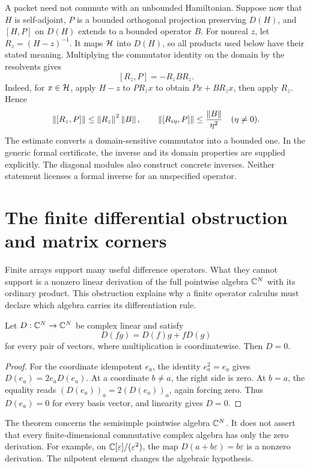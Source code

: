 A packet need not commute with an unbounded Hamiltonian. Suppose now that $H$ is self-adjoint, $P$ is a bounded orthogonal projection preserving $D(H)$, and $[H,P]$ on $D(H)$ extends to a bounded operator $B$. For nonreal $z$, let $R_z=(H-z)^{-1}$. It maps $\mathcal H$ into $D(H)$, so all products used below have their stated meaning. Multiplying the commutator identity on the domain by the resolvents gives
\[
 [R_z,P]=-R_zBR_z.
\]
Indeed, for $x\in\mathcal H$, apply $H-z$ to $PR_zx$ to obtain $Px+BR_zx$, then apply $R_z$. Hence
\[
 \left\lVert[R_z,P]\right\rVert\leq\left\lVert R_z\right\rVert^2\left\lVert B\right\rVert,
 \qquad
 \left\lVert[R_{i\eta},P]\right\rVert\leq\frac{\left\lVert B\right\rVert}{\eta^2}
 \quad(\eta\ne0).
\]
The estimate converts a domain-sensitive commutator into a bounded one. In the generic formal certificate, the inverse and its domain properties are supplied explicitly. The diagonal modules also construct concrete inverses. Neither statement licenses a formal inverse for an unspecified operator.



\clearpage
\section{The finite differential obstruction and matrix corners}
\label{sec:foundation-corner-derivations}

Finite arrays support many useful difference operators. What they cannot support is a nonzero linear derivation of the full pointwise algebra $\mathbb C^N$ with its ordinary product. This obstruction explains why a finite operator calculus must declare which algebra carries its differentiation rule.

\begin{theorem}
Let $D:\mathbb C^N\to\mathbb C^N$ be complex linear and satisfy
\[
 D(fg)=D(f)g+fD(g)
\]
for every pair of vectors, where multiplication is coordinatewise. Then $D=0$.
\end{theorem}
\begin{proof}
For the coordinate idempotent $e_a$, the identity $e_a^2=e_a$ gives $D(e_a)=2e_aD(e_a)$. At a coordinate $b\ne a$, the right side is zero. At $b=a$, the equality reads $(D(e_a))_a=2(D(e_a))_a$, again forcing zero. Thus $D(e_a)=0$ for every basis vector, and linearity gives $D=0$.
\end{proof}

The theorem concerns the semisimple pointwise algebra $\mathbb C^N$. It does not assert that every finite-dimensional commutative complex algebra has only the zero derivation. For example, on $\mathbb C[\varepsilon]/(\varepsilon^2)$, the map $D(a+b\varepsilon)=b\varepsilon$ is a nonzero derivation. The nilpotent element changes the algebraic hypothesis.

